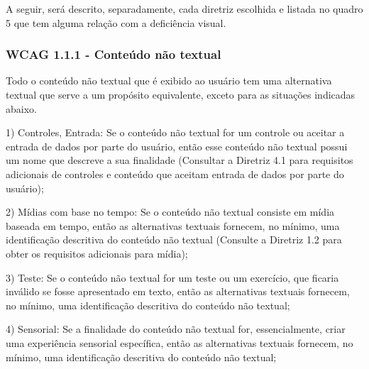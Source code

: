 \documentclass[a4paper]{article}
\begin{document}
\begin{titlepage}
A seguir, será descrito, separadamente, cada diretriz escolhida e listada no quadro 5 que tem alguma relação com a deficiência visual.

\subsubsection{WCAG 1.1.1 - Conteúdo não textual}

Todo o conteúdo não textual que é exibido ao usuário tem uma alternativa textual que serve a um propósito equivalente, exceto para as situações indicadas abaixo.\\

\hspace{.1\textwidth} %
\begin{minipage}{.85\textwidth}
	1) Controles, Entrada: Se o conteúdo não textual for um controle ou aceitar a entrada de dados por parte do usuário, então esse conteúdo não textual possui um nome que descreve a sua finalidade (Consultar a Diretriz 4.1 para requisitos adicionais de controles e conteúdo que aceitam entrada de dados por parte do usuário);\\
\end{minipage}

\hspace{.1\textwidth} %
\begin{minipage}{.85\textwidth}
	2) Mídias com base no tempo: Se o conteúdo não textual consiste em mídia baseada em tempo, então as alternativas textuais fornecem, no mínimo, uma identificação descritiva do conteúdo não textual (Consulte a Diretriz 1.2 para obter os requisitos adicionais para mídia);\\
\end{minipage}

\hspace{.1\textwidth} %
\begin{minipage}{.85\textwidth}
	3) Teste: Se o conteúdo não textual for um teste ou um exercício, que ficaria inválido se fosse apresentado em texto, então as alternativas textuais fornecem, no mínimo, uma identificação descritiva do conteúdo não textual;\\
\end{minipage}

\hspace{.1\textwidth} %
\begin{minipage}{.85\textwidth}
	4) Sensorial: Se a finalidade do conteúdo não textual for, essencialmente, criar uma experiência sensorial específica, então as alternativas textuais fornecem, no mínimo, uma identificação descritiva do conteúdo não textual;\\
\end{minipage}


\end{titlepage}
\end{document}
